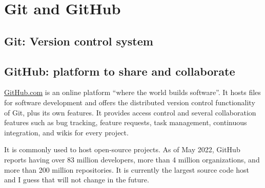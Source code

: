\chapter{Git and GitHub}\label{ch:git}

\section{Git: Version control system}

\section{GitHub: platform to share and collaborate}
\url{GitHub.com} is an online platform ``where the world builds software''. It hosts files for software development and offers the distributed version control functionality of Git, plus its own features. It provides access control and several collaboration features such as bug tracking, feature requests, task management, continuous integration, and wikis for every project.

It is commonly used to host open-source projects. As of May 2022, GitHub reports having over 83 million developers, more than 4 million organizations, and more than 200 million repositories. It is currently the largest source code host and I guess that will not change in the future. 


